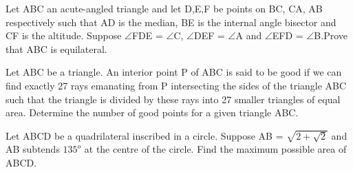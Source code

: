 \item Let ABC an acute-angled triangle and let D,E,F be points on BC, CA, AB respectively such that AD is the median, BE is the internal angle bisector and CF is the altitude. Suppose $\angle$FDE = $\angle$C, $\angle$DEF = $\angle$A and $\angle$EFD = $\angle$B.Prove that ABC is equilateral.

\item Let ABC be a triangle. An interior point P of ABC is said to be good if we can find exactly 27 rays emanating from P intersecting the sides of the triangle ABC such that the triangle is divided by these rays into 27 smaller triangles of equal area. Determine the number of good points for a given triangle ABC.

\item Let ABCD be a quadrilateral inscribed in a circle. Suppose AB = $\sqrt{2 + \sqrt{2}}$ and AB subtends $135^{o}$ at the centre of the circle. Find the maximum possible area of ABCD.

























